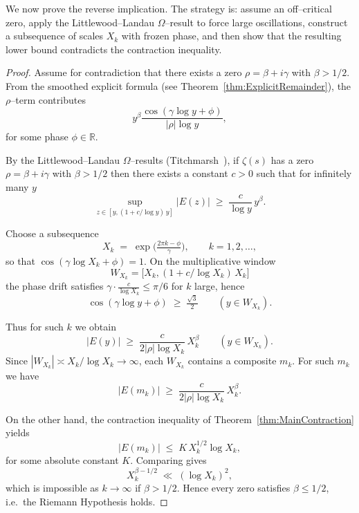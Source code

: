 \documentclass[11pt]{article}
\theoremstyle{plain}
\theoremstyle{definition}
\theoremstyle{remark}
\begin{document}
We now prove the reverse implication. The strategy is: assume an off–critical zero, apply the Littlewood--Landau $\Omega$–result to force large oscillations, construct a subsequence of scales $X_k$ with frozen phase, and then show that the resulting lower bound contradicts the contraction inequality.

\begin{proof}
Assume for contradiction that there exists a zero $\rho=\beta+i\gamma$ with $\beta>1/2$.  
From the smoothed explicit formula (see Theorem~\ref{thm:ExplicitRemainder}), the $\rho$–term contributes
\[
y^\beta \frac{\cos(\gamma\log y+\phi)}{|\rho|\log y},
\]
for some phase $\phi\in\mathbb{R}$.

By the Littlewood--Landau $\Omega$–results 
(Titchmarsh~\cite[Theorem~14.25]{Titchmarsh}), 
if $\zeta(s)$ has a zero $\rho=\beta+i\gamma$ with $\beta>1/2$ then there exists 
a constant $c>0$ such that for infinitely many $y$
\[
\sup_{z\in[y,(1+c/\log y)\,y]} |E(z)|
\;\ge\; \frac{c}{\log y}\,y^{\beta}.
\]

Choose a subsequence
\[
X_k \;=\; \exp\!\Big(\tfrac{2\pi k-\phi}{\gamma}\Big), \qquad k=1,2,\dots,
\]
so that $\cos(\gamma\log X_k+\phi)=1$.
On the multiplicative window
\[
W_{X_k}=\big[X_k,(1+c/\log X_k)\,X_k\big]
\]
the phase drift satisfies $\gamma\cdot\frac{c}{\log X_k}\le \pi/6$ for $k$ large, hence
\[
\cos(\gamma\log y+\phi)\;\ge\;\tfrac{\sqrt3}{2}\qquad (y\in W_{X_k}).
\]

Thus for such $k$ we obtain
\[
|E(y)| \;\ge\; \frac{c}{2|\rho|\log X_k}\,X_k^\beta
\qquad (y\in W_{X_k}).
\]
Since $|W_{X_k}|\asymp X_k/\log X_k\to\infty$, each $W_{X_k}$ contains a composite
$m_k$. For such $m_k$ we have
\[
|E(m_k)| \;\ge\; \frac{c}{2|\rho|\log X_k}\,X_k^\beta.
\]

On the other hand, the contraction inequality of
Theorem~\ref{thm:MainContraction} yields
\[
|E(m_k)| \;\le\; K\,X_k^{1/2}\log X_k,
\]
for some absolute constant $K$.
Comparing gives
\[
X_k^{\beta-1/2} \;\ll\; (\log X_k)^2,
\]
which is impossible as $k\to\infty$ if $\beta>1/2$. Hence every zero
satisfies $\beta\le 1/2$, i.e.\ the Riemann Hypothesis holds.
\end{proof}
\end{document}
